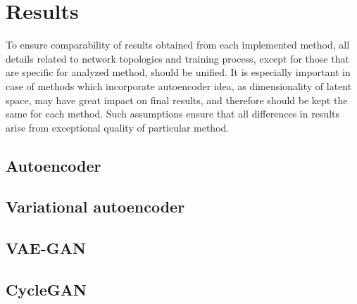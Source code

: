 \chapter{Results}
To ensure comparability of results obtained from each implemented method, all details related to network topologies and training process, except for those that are specific for analyzed method, should be unified. It is especially important in case of methods which incorporate autoencoder idea, as dimensionality of latent space, may have great impact on final results, and therefore should be kept the same for each method. Such assumptions ensure that all differences in results arise from exceptional quality of particular method.

\section{Autoencoder}

\section{Variational autoencoder}
\section{VAE-GAN}
\section{CycleGAN}